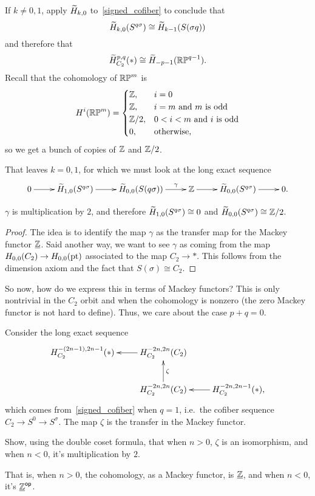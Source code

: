 If $k\ne 0,1$, apply $\widetilde H_{k,0}$ to~\eqref{signed_cofiber} to conclude that
\[\widetilde H_{k,0}(S^{q\sigma})\cong \widetilde H_{k-1}(S(\sigma q))\]
and therefore that
\[\widetilde H_{C_2}^{p,q}(*)\cong \widetilde H_{-p-1}(\mathbb{RP}^{q-1}).\]
Recall that the cohomology of $\mathbb{RP}^m$ is
\[H^i(\mathbb{RP}^m) = \begin{cases}
	\mathbb Z, &i = 0\\
	\mathbb Z, &i = m\text{ and $m$ is odd}\\
	\mathbb Z/2, &0 < i < m\text{ and $i$ is odd}\\
	0, &\text{otherwise,}
\end{cases}\]
so we get a bunch of copies of $\mathbb Z$ and $\mathbb Z/2$.

That leaves $k = 0,1$, for which we must look at the long exact sequence
\[\xymatrix{
	0\ar[r] & \wH_{1,0}(S^{q\sigma})\ar[r] & \wH_{0,0}(S(q\sigma))\ar[r]^-\gamma &\Z\ar[r] &
	\wH_{0,0}(S^{q\sigma})\ar[r] & 0.
}\]
\begin{claim}
$\gamma$ is multiplication by $2$, and therefore $\widetilde H_{1,0}(S^{q\sigma})\cong 0$ and
$\widetilde H_{0,0}(S^{q\sigma})\cong\mathbb Z/2$.
\end{claim}
\begin{proof}
The idea is to identify the map $\gamma$ as the transfer map for the Mackey functor $\underline{\mathbb Z}$. Said another
way, we want to see $\gamma$ as coming from the map $H_{0,0}(C_2)\to H_{0,0}(\mathrm{pt})$ associated to the map $C_2\to
*$. This follows from the dimension axiom and the fact that $S(\sigma)\cong C_2$.
\end{proof}
So now, how do we express this in terms of Mackey functors? This is only nontrivial in the $C_2$ orbit and when the
cohomology is nonzero (the zero Mackey functor is not hard to define). Thus, we care about the case $p+q = 0$.

Consider the long exact sequence
\[\xymatrix{
	H_{C_2}^{-(2n-1), 2n-1}(*) & H_{C_2}^{-2n,2n}(C_2)\ar[l]\\
	& H_{C_2}^{-2n,2n}(C_2)\ar[u]_\zeta & H_{C_2}^{-2n,2n-1}(*),\ar[l]
}\]
which comes from~\eqref{signed_cofiber} when $q = 1$, i.e.\ the cofiber sequence $C_2\to S^0\to S^\sigma$. The map
$\zeta$ is the transfer in the Mackey functor.
\begin{ex}
Show, using the double coset formula, that when $n > 0$, $\zeta$ is an isomorphism, and when $n < 0$, it's
multiplication by $2$.
\end{ex}
That is, when $n > 0$, the cohomology, as a Mackey functor, is $\underline{\mathbb Z}$, and when $n < 0$, it's
$\underline{\mathbb Z}^{\mathsf{op}}$.
